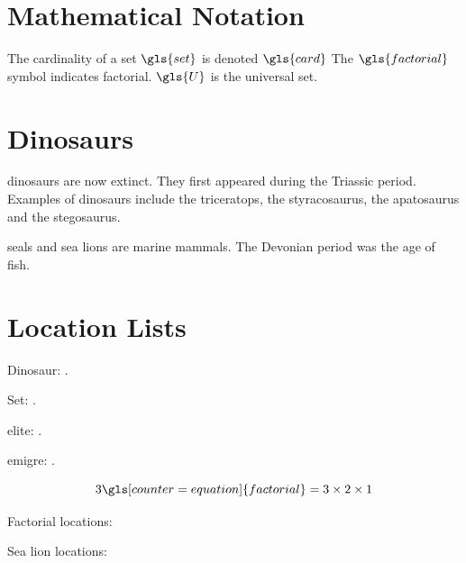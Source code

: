 \documentclass{report}
\begin{document}
\chapter{Mathematical Notation}

The cardinality of a set $\gls{set}$ is denoted $\gls{card}$
The $\gls{factorial}$ symbol indicates factorial.
$\gls{U}$ is the universal set.

\glsaddall[types=main]

\chapter{Dinosaurs}

\Glspl{dinosaur} are now extinct. They first appeared during the
\gls{Triassic} period. Examples of \glspl{dinosaur} include the
\gls{triceratops}, the \gls{styracosaurus}, the \gls{apatosaurus} and the \gls{stegosaurus}.

\Glspl{seal} and \glspl{sea lion} are marine mammals.
The \gls{Devonian} period was the age of fish.

\glsaddall[types=main]

\chapter{Location Lists}

Dinosaur: .

Set: .

\Gls{elite}: .

\Gls{emigre}: .

\begin{equation}
3\gls[counter=equation]{factorial} = 3 \times 2 \times 1
\end{equation}

\newcommand{\myhandler}[4]{%
  Prefix: #1.
  Counter: #2.
  Format: #3.
  Value: #4.
  Link: \setentrycounter[#1]{#2}%
  \csuse{#3}{#4}.
  \par
}
\newcommand{\myxrhandler}[2][]{XR (#1): #2. }

Factorial locations:

Sea lion locations:

\printnoidxglossary[type=main,sort=word]

\printnoidxglossary[type=symbols,sort=use]

\renewcommand*{\glsnamefont}[1]{\textmd{#1}}

\printnoidxglossary[type=index,style=mcolindexgroup,sort=word]
\end{document}
